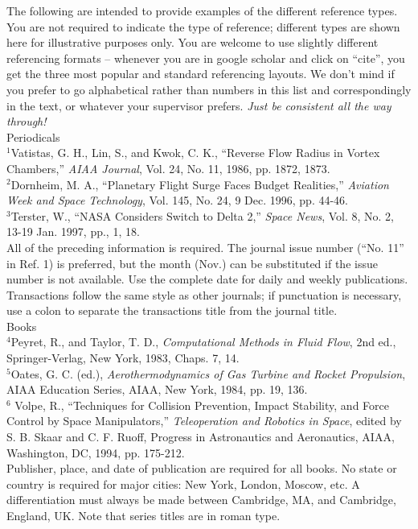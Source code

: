 The following are intended to provide examples of the different reference types. You are not required to indicate the type of reference; different types are shown here for illustrative purposes only. You are welcome to use slightly different referencing formats – whenever you are in google scholar and click on “cite”, you get the three most popular and standard referencing layouts. We don’t mind if you prefer to go alphabetical rather than numbers in this list and correspondingly in the text, or whatever your supervisor prefers. \textit{Just be consistent all the way through!} \\

Periodicals \\
$^1$Vatistas, G. H., Lin, S., and Kwok, C. K., “Reverse Flow Radius in Vortex Chambers,” \textit{AIAA Journal}, Vol. 24, No. 11, 1986, pp. 1872, 1873. \\
$^2$Dornheim, M. A., “Planetary Flight Surge Faces Budget Realities,” \textit{Aviation Week and Space Technology}, Vol. 145, No. 24, 9 Dec. 1996, pp. 44-46. \\
$^3$Terster, W., “NASA Considers Switch to Delta 2,” \textit{Space News}, Vol. 8, No. 2, 13-19 Jan. 1997, pp., 1, 18. \\

All of the preceding information is required. The journal issue number (“No. 11” in Ref. 1) is preferred, but the month (Nov.) can be substituted if the issue number is not available. Use the complete date for daily and weekly publications. Transactions follow the same style as other journals; if punctuation is necessary, use a colon to separate the transactions title from the journal title. \\

Books \\
$^4$Peyret, R., and Taylor, T. D., \textit{Computational Methods in Fluid Flow}, 2nd ed., Springer-Verlag, New York, 1983, Chaps. 7, 14. \\
$^5$Oates, G. C. (ed.), \textit{Aerothermodynamics of Gas Turbine and Rocket Propulsion}, AIAA Education Series, AIAA, New York, 1984, pp. 19, 136. \\
$^6$ Volpe, R., “Techniques for Collision Prevention, Impact Stability, and Force Control by Space Manipulators,” \textit{Teleoperation and Robotics in Space}, edited by S. B. Skaar and C. F. Ruoff, Progress in Astronautics and Aeronautics, AIAA, Washington, DC, 1994, pp. 175-212. \\

Publisher, place, and date of publication are required for all books. No state or country is required for major cities: New York, London, Moscow, etc. A differentiation must always be made between Cambridge, MA, and Cambridge, England, UK. Note that series titles are in roman type. \\

